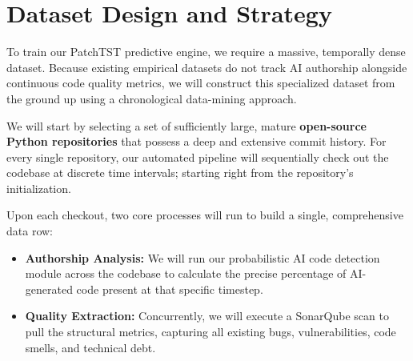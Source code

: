 \section{Dataset Design and Strategy}

To train our PatchTST predictive engine, we require a massive, temporally dense dataset. Because existing empirical datasets do not track AI authorship alongside continuous code quality metrics, we will construct this specialized dataset from the ground up using a chronological data-mining approach.

We will start by selecting a set of sufficiently large, mature \textbf{open-source Python repositories} that possess a deep and extensive commit history. For every single repository, our automated pipeline will sequentially check out the codebase at discrete time intervals; starting right from the repository's initialization.

Upon each checkout, two core processes will run to build a single, comprehensive data row:

\begin{itemize}
    \item \textbf{Authorship Analysis:} We will run our probabilistic AI code detection module across the codebase to calculate the precise percentage of AI-generated code present at that specific timestep. 
    \item \textbf{Quality Extraction:} Concurrently, we will execute a SonarQube scan to pull the structural metrics, capturing all existing bugs, vulnerabilities, code smells, and technical debt. 

\end{itemize}
